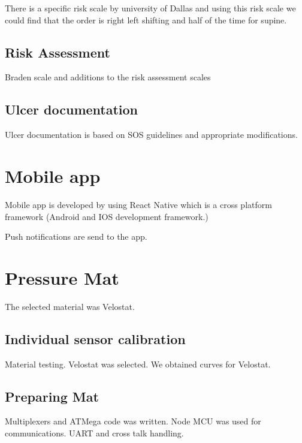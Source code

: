 There is a specific risk scale by university of Dallas and using this risk scale we could find that the order is right left shifting and half of the time for supine.

\subsection{Risk Assessment}

Braden scale and additions to the risk assessment scales

\subsection{Ulcer documentation}

Ulcer documentation is based on SOS guidelines and appropriate modifications.




\section{Mobile app} 

Mobile app is developed by using React Native which is a cross platform framework (Android and IOS development framework.)

Push notifications are send to the app.




\section{Pressure Mat}


The selected material was Velostat. 

\subsection{Individual sensor calibration}

 Material testing. Velostat was selected. We obtained curves for Velostat.


\subsection{Preparing Mat}

Multiplexers and ATMega code was written. Node MCU was used for communications. UART and cross talk handling.





